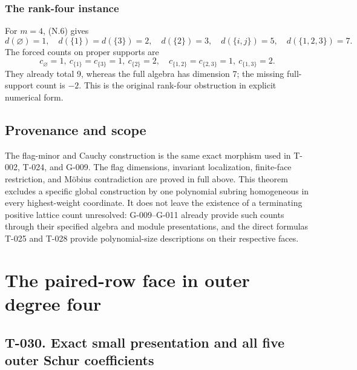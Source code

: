 \documentclass[
  10pt,
]{article}
\begin{document}
\subsubsection{The rank-four instance}\label{the-rank-four-instance}

For \(m=4\), (N.6) gives \[
d(\varnothing)=1,\quad d(\{1\})=d(\{3\})=2,\quad d(\{2\})=3,
\quad d(\{i,j\})=5,\quad d(\{1,2,3\})=7.
\] The forced counts on proper supports are \[
c_\varnothing=1,\ c_{\{1\}}=c_{\{3\}}=1,\ c_{\{2\}}=2,
\quad c_{\{1,2\}}=c_{\{2,3\}}=1,\ c_{\{1,3\}}=2.
\] They already total 9, whereas the full algebra has dimension 7; the
missing full-support count is \(-2\). This is the original rank-four
obstruction in explicit numerical form.

\subsection{Provenance and scope}\label{provenance-and-scope}

The flag-minor and Cauchy construction is the same exact morphism used
in T-002, T-024, and G-009. The flag dimensions, invariant localization,
finite-face restriction, and Möbius contradiction are proved in full
above. This theorem excludes a specific global construction by one
polynomial subring homogeneous in every highest-weight coordinate. It
does not leave the existence of a terminating positive lattice count
unresolved: G-009--G-011 already provide such counts through their
specified algebra and module presentations, and the direct formulas
T-025 and T-028 provide polynomial-size descriptions on their respective
faces.

\section{The paired-row face in outer degree
four}\label{the-paired-row-face-in-outer-degree-four}

\subsection{T-030. Exact small presentation and all five outer Schur
coefficients}\label{t-030.-exact-small-presentation-and-all-five-outer-schur-coefficients}
\end{document}
